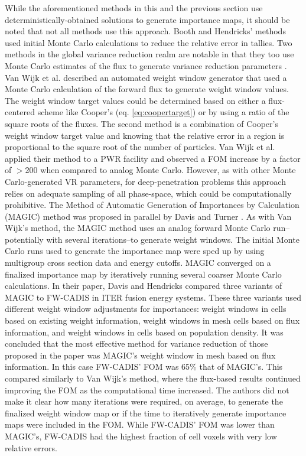 While the aforementioned methods in this and the previous section use
deterministically-obtained solutions to generate importance maps, it should be
noted that not all methods use this approach. Booth and Hendricks' methods used
initial Monte Carlo calculations to reduce the relative error in tallies. Two
methods in the global variance reduction realm are notable in that they too use
Monte Carlo estimates of the flux to generate variance reduction parameters
\cite{van_wijk_easy_2011, davis_comparison_2011}.
Van Wijk et al. \cite{van_wijk_easy_2011} described an automated weight
window generator that used a Monte
Carlo calculation of the forward flux to generate weight window values. The
weight window target values could be determined based on either a flux-centered
scheme like Cooper's (eq. \eqref{eq:coopertarget})
or by using a ratio of the square roots of the fluxes. The
second method is a combination of Cooper's weight window target value and
knowing that the relative error in a region
is proportional to the square root of the number
of particles.
Van Wijk et al. applied their method to a PWR facility and observed a FOM
increase by a factor of $>$200 when compared to analog Monte Carlo. However, as
with other Monte Carlo-generated VR parameters, for deep-penetration problems
this approach relies on adequate sampling of all phase-space, which could be
computationally prohibitive.
The Method of Automatic Generation of Importances by Calculation (MAGIC) method
was proposed in parallel by Davis and Turner \cite{davis_comparison_2011}.
As with Van Wijk's method, the MAGIC method uses an analog forward Monte Carlo
run--potentially with several iterations--to generate weight windows. The initial
Monte Carlo runs used to generate the importance map were sped up by
using multigroup cross section data and energy cutoffs. MAGIC
converged on a finalized importance map by iteratively running several coarser
Monte Carlo calculations.
In their paper, Davis and Hendricks compared three variants of MAGIC
to FW-CADIS in ITER fusion energy systems.
These three variants used different weight window adjustments for importances:
weight windows in cells based on existing weight information, weight windows in
mesh cells based on flux information, and weight windows in cells based on
population density.
It was concluded that the most effective method for variance
reduction of those proposed in the paper
was MAGIC's weight window in mesh based on flux
information. In this case FW-CADIS' FOM was 65\% that of MAGIC's. This compared
similarly to Van Wijk's method, where the flux-based results continued improving
the FOM as the computational time increased.
The authors did not make it clear how many iterations were required, on average,
to generate the finalized weight window map or if the time to iteratively
generate importance maps were included in the FOM. While FW-CADIS' FOM was lower
than MAGIC's, FW-CADIS had the highest fraction of cell voxels with very low
relative errors.

